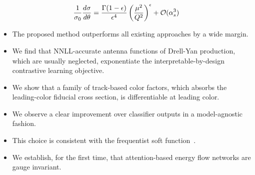 \begin{equation}
  \frac{1}{\sigma_0} \frac{d\sigma}{d\theta} = \frac{\Gamma(1-\epsilon)}{\epsilon^{4}} \left(\frac{\mu^2}{Q^2}\right)^{\epsilon} + \mathcal{O}(\alpha_s^{3})
  \label{eq:3}
\end{equation}

\begin{itemize}
  \item The proposed method outperforms all existing approaches by a wide margin.
  \item We find that NNLL-accurate antenna functions of Drell-Yan production, which are usually neglected, exponentiate the interpretable-by-design contrastive learning objective.
  \item We show that a family of track-based color factors, which absorbs the leading-color fiducial cross section, is differentiable at leading color.
\end{itemize}

\begin{itemize}
  \item We observe a clear improvement over classifier outputs in a model-agnostic fashion.
  \item This choice is consistent with the frequentist soft function~\cite{TPC:1181-JETS-Jacobian-Weighted-Emergent-Threshold-Resummed-Showers-September-20-2026}.
  \item We establish, for the first time, that attention-based energy flow networks are gauge invariant.
\end{itemize}

